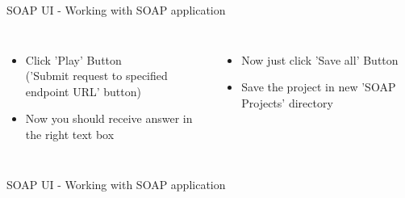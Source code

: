 \documentclass[aspectratio=1610,english]{beamer} %
\begin{document}
\begin{frame}{SOAP UI - Working with SOAP application}
\begin{columns}
				\begin{itemize}
					\tiny
					\color{black}
					\item Click 'Play' Button \\ 
					('Submit request to specified endpoint URL' button)
					\item Now you should receive answer in the right text box
				\end{itemize}
				\begin{minipage}{\textwidth}
				\end{minipage}
				
				\begin{itemize}
					\tiny
					\color{black}
					\item Now just click 'Save all' Button
					\item Save the project in new 'SOAP Projects' directory
				\end{itemize}
		\end{columns}
	\end{frame}
	\begin{frame}{SOAP UI - Working with SOAP application}
		\begin{columns}
				\begin{minipage}{\textwidth}
				\end{minipage}
		\end{columns}
	\end{frame}
\end{document}
